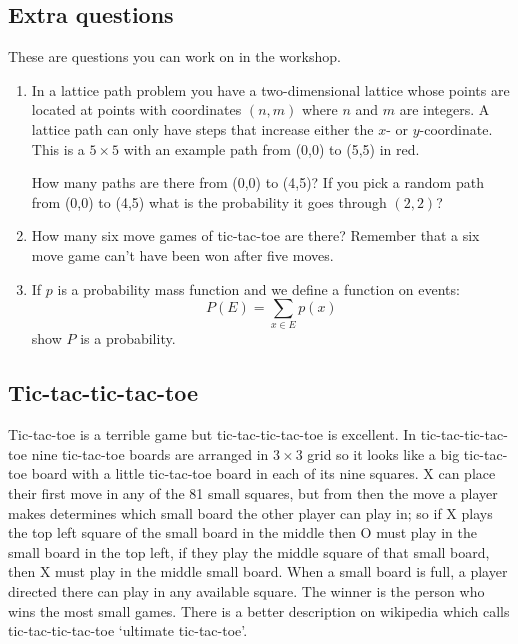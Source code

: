 \documentclass[11pt,a4paper]{scrartcl}
\begin{document}
\subsection*{Extra questions}

These are questions you can work on in the workshop.

\begin{enumerate}

\item In a lattice path problem you have a two-dimensional lattice
  whose points are located at points with coordinates $(n,m)$ where
  $n$ and $m$ are integers. A lattice path can only have steps that
  increase either the $x$- or $y$-coordinate. This is a $5\times5$ with an example path from (0,0) to (5,5) in red.
\begin{center}
\end{center}
How many paths are there from (0,0) to (4,5)? If you pick a random path from (0,0) to (4,5) what is the probability it goes through $(2,2)$?

\item How many six move games of tic-tac-toe are there? Remember that
  a six move game can't have been won after five moves.

\item If $p$ is a probability mass function and we define a function on events:
  \begin{equation}
    P(E)=\sum_{x\in E}p(x)
  \end{equation}
  show $P$ is a probability.
  
\end{enumerate}

\subsection*{Tic-tac-tic-tac-toe}

Tic-tac-toe is a terrible game but tic-tac-tic-tac-toe is
excellent. In tic-tac-tic-tac-toe nine tic-tac-toe boards are arranged
in $3\times 3$ grid so it looks like a big tic-tac-toe board with a
little tic-tac-toe board in each of its nine squares. X can place
their first move in any of the 81 small squares, but from then the
move a player makes determines which small board the other player can
play in; so if X plays the top left square of the small board in the
middle then O must play in the small board in the top left, if they
play the middle square of that small board, then X must play in the
middle small board. When a small board is full, a player directed
there can play in any available square. The winner is the person who
wins the most small games. There is a better description on wikipedia
which calls tic-tac-tic-tac-toe `ultimate tic-tac-toe'.
\end{document}
